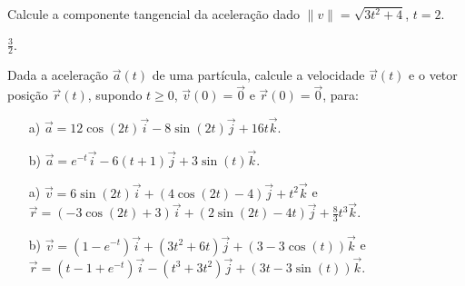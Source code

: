 \begin{exer}Calcule a componente tangencial da aceleração dado $\|v\|=\sqrt{3t^2+4}$, $t=2$.
\end{exer}
\begin{resp}
 $\frac{3}{2}$.
\end{resp}


\begin{exer}Dada a aceleração $\vec{a}(t)$ de uma partícula, calcule a velocidade $\vec{v}(t)$ e o vetor posição $\vec{r}(t)$, supondo $t\geq 0$, $\vec{v}(0)=\vec{0}$ e  $\vec{r}(0)=\vec{0}$, para:
\begin{itemize}
 \item[a)] $\vec{a}=12\cos(2t)\vec{i}-8\sin(2t)\vec{j}+16t\vec{k}$.
 \item[b)] $\vec{a}=e^{-t}\vec{i}-6(t+1)\vec{j}+3\sin(t)\vec{k}$. 
\end{itemize}
\end{exer}
\begin{resp}
\begin{itemize}
 \item[a)] $\vec{v}=6\sin(2t)\vec{i}+(4\cos(2t)-4)\vec{j}+t^2\vec{k}$ e $\vec{r}=(-3\cos(2t)+3)\vec{i}+(2\sin(2t)-4t)\vec{j}+\frac{8}{3}t^3\vec{k}$.
  \item[b)] $\vec{v}=(1-e^{-t})\vec{i}+(3t^2+6t)\vec{j}+(3-3\cos(t))\vec{k}$ e $\vec{r}=(t-1+e^{-t})\vec{i}-(t^3+3t^2)\vec{j}+(3t-3\sin(t))\vec{k}$.
\end{itemize}
\end{resp}






 















